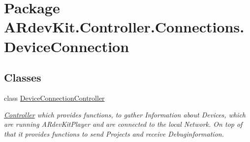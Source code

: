\hypertarget{namespace_a_rdev_kit_1_1_controller_1_1_connections_1_1_device_connection}{\section{Package A\-Rdev\-Kit.\-Controller.\-Connections.\-Device\-Connection}
\label{namespace_a_rdev_kit_1_1_controller_1_1_connections_1_1_device_connection}
}
\subsection*{Classes}
\begin{DoxyCompactItemize}
\item 
class \hyperlink{class_a_rdev_kit_1_1_controller_1_1_connections_1_1_device_connection_1_1_device_connection_controller}{Device\-Connection\-Controller}
\begin{DoxyCompactList}\small\item\em \hyperlink{namespace_a_rdev_kit_1_1_controller}{Controller} which provides functions, to gather Information about Devices, which are running A\-Rdev\-Kit\-Player and are connected to the local Network. On top of that it provides functions to send Projects and receive Debuginformation. \end{DoxyCompactList}\end{DoxyCompactItemize}
